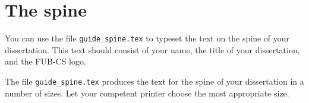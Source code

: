 \section{The spine}
You can use the file {\tt guide\_spine.tex} to
typeset the text on the spine of your dissertation. This
text should consist of your name, the title of your dissertation,
and the FUB-CS logo.

The file {\tt guide\_spine.tex} produces the text for the spine
of your dissertation in a number of sizes. Let your competent printer
choose the most appropriate size.





